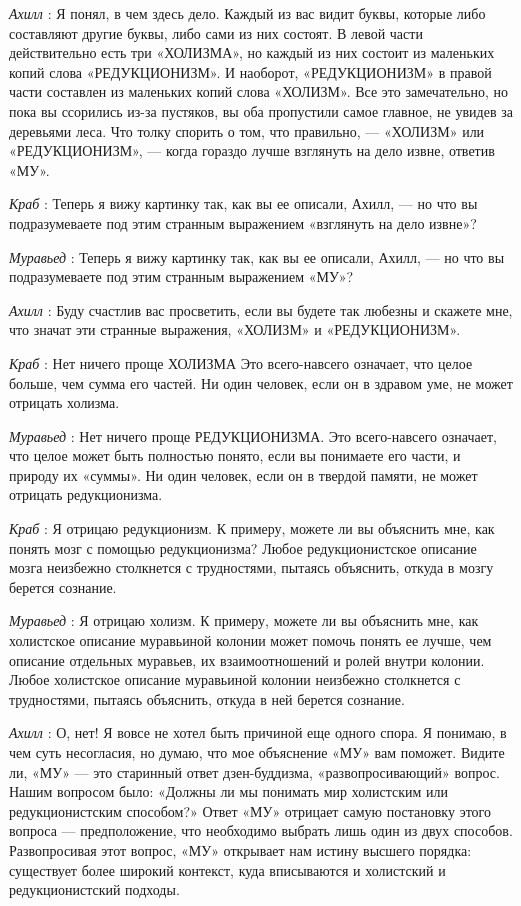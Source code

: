 \documentclass[../main.tex]{subfiles}
\begin{document}
\begin{dialogue}
\emph{Ахилл} : Я понял, в чем здесь дело. Каждый из вас видит буквы, которые либо составляют другие буквы, либо сами из них состоят. В левой части действительно есть три «ХОЛИЗМА», но каждый из них состоит из маленьких копий слова «РЕДУКЦИОНИЗМ». И наоборот, «РЕДУКЦИОНИЗМ» в правой части составлен из маленьких копий слова «ХОЛИЗМ». Все это замечательно, но пока вы ссорились из-за пустяков, вы оба пропустили самое главное, не увидев за деревьями леса. Что толку спорить о том, что правильно, --- «ХОЛИЗМ» или «РЕДУКЦИОНИЗМ», --- когда гораздо лучше взглянуть на дело извне, ответив «МУ».

\emph{Краб} : Теперь я вижу картинку так, как вы ее описали, Ахилл, --- но что вы подразумеваете под этим странным выражением «взглянуть на дело извне»?

\emph{Муравьед} : Теперь я вижу картинку так, как вы ее описали, Ахилл, --- но что вы подразумеваете под этим странным выражением «МУ»?

\emph{Ахилл} : Буду счастлив вас просветить, если вы будете так любезны и скажете мне, что значат эти странные выражения, «ХОЛИЗМ» и «РЕДУКЦИОНИЗМ».

\emph{Краб} : Нет ничего проще ХОЛИЗМА Это всего-навсего означает, что целое больше, чем сумма его частей. Ни один человек, если он в здравом уме, не может отрицать холизма.

\emph{Муравьед} : Нет ничего проще РЕДУКЦИОНИЗМА. Это всего-навсего означает, что целое может быть полностью понято, если вы понимаете его части, и природу их «суммы». Ни один человек, если он в твердой памяти, не может отрицать редукционизма.

\emph{Краб} : Я отрицаю редукционизм. К примеру, можете ли вы объяснить мне, как понять мозг с помощью редукционизма? Любое редукционистское описание мозга неизбежно столкнется с трудностями, пытаясь объяснить, откуда в мозгу берется сознание.

\emph{Муравьед} : Я отрицаю холизм. К примеру, можете ли вы объяснить мне, как холистское описание муравьиной колонии может помочь понять ее лучше, чем описание отдельных муравьев, их взаимоотношений и ролей внутри колонии. Любое холистское описание муравьиной колонии неизбежно столкнется с трудностями, пытаясь объяснить, откуда в ней берется сознание.

\emph{Ахилл} : О, нет! Я вовсе не хотел быть причиной еще одного спора. Я понимаю, в чем суть несогласия, но думаю, что мое объяснение «МУ» вам поможет. Видите ли, «МУ» --- это старинный ответ дзен-буддизма, «развопросивающий» вопрос. Нашим вопросом было: «Должны ли мы понимать мир холистским или редукционистским способом?» Ответ «МУ» отрицает самую постановку этого вопроса --- предположение, что необходимо выбрать лишь один из двух способов. Развопросивая этот вопрос, «МУ» открывает нам истину высшего порядка: существует более широкий контекст, куда вписываются и холистский и редукционистский подходы.


\end{dialogue}
\end{document}
